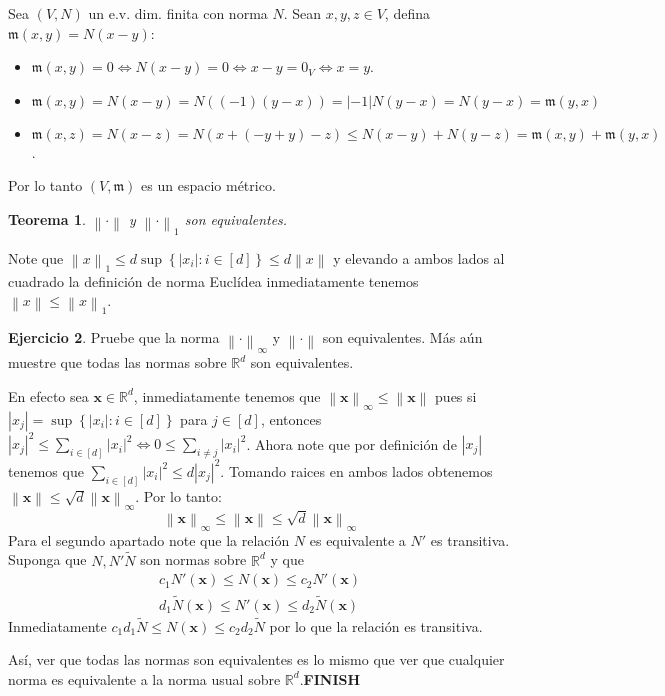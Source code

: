 \documentclass[12pt]{article}
\theoremstyle{plain}
\newtheorem{Th}{Teorema}[subsection]   %
\theoremstyle{definition}
\newtheorem{Ej}[Th]{Ejercicio}
\theoremstyle{remark}
\numberwithin{equation}{section}
\newcommand{\bR}{\mathbb{R}}        %
\newcommand{\mm}{\mathfrak{m}}      %
\renewcommand{\leq}{\leqslant}      %
\renewcommand{\:}{\colon}           %
\renewcommand{\vec}[1]{\mathbf{#1}}
\newcommand{\vx}{\vec{x}}           %
\newcommand{\conj}[1]{\left\lbrace#1\right\rbrace}
\newcommand{\bonj}[1]{\left\lbrack#1\right\rbrack}
\newcommand{\nm}[1]{\left\|#1\right\|} %
\begin{document}
\begin{multicols}{2}
\begin{ptcbp}
Sea $(V,N)$ un e.v. dim. finita con norma $N$.  Sean $x,y,z\in V$, defina $\mm(x,y)=N(x-y)$:
\begin{itemize}
  \item $\mm(x,y)=0\iff N(x-y)=0\iff x-y=0_V\iff x=y$.

  \item $\mm(x,y)=N(x-y)=N((-1)(y-x))=|-1|N(y-x)=N(y-x)=\mm(y,x)$
   \item $\mm(x,z)=N(x-z)=N(x+(-y+y)-z)\leq N(x-y)+N(y-z)=\mm(x,y)+\mm(y,x)$.
\end{itemize}
Por lo tanto $(V,\mm)$ es un espacio métrico.
\end{ptcbp}

\begin{Th}
  $\nm{\cdot}$ y $\nm{\cdot}_1$ son equivalentes.
\end{Th}
\begin{ptcbp}

Note que $\nm{x}_1\leq d\sup\conj{|x_i|\colon i\in\bonj{d}}\leq d\nm{x}$ y elevando a ambos lados al cuadrado la definición de norma Euclídea inmediatamente tenemos $\nm{x}\leq \nm{x}_1$.

\end{ptcbp}

\begin{Ej}
  Pruebe que la norma $\nm{\cdot}_\infty$ y $\nm{\cdot}$ son equivalentes. Más aún muestre que todas las normas sobre $\bR^d$ son equivalentes.
\end{Ej}

\begin{ptcb}
En efecto sea $\vx\in\bR^d$, inmediatamente tenemos que $\nm{\vx}_\infty\leq \nm{\vx}$ pues si $|x_j|=\sup\conj{|x_i|\colon i\in\bonj{d}}$ para $j\in\bonj{d}$, entonces $|x_j|^2\leq\sum_{i\in\bonj{d}}|x_i|^2\iff 0\leq \sum_{i\neq j}|x_i|^2$. Ahora note que por definición de $|x_j|$ tenemos que $\sum_{i\in\bonj{d}}|x_i|^2\leq d|x_j|^2$. Tomando raices en ambos lados obtenemos $\nm{\vx}\leq \sqrt{d}\nm{\vx}_\infty$. Por lo tanto:
$$\nm{\vx}_\infty\leq \nm{\vx}\leq \sqrt{d}\nm{\vx}_\infty$$
Para el segundo apartado note que la relación $N$ es equivalente a $N'$ es transitiva. Suponga que $N,N'\widetilde{N}$ son normas sobre $\bR^d$ y que
\begin{gather*}
  c_1N'(\vx)\leq N(\vx)\leq c_2N'(\vx)\\
  d_1\widetilde{N}(\vx)\leq N'(\vx)\leq d_2\widetilde{N}(\vx)
\end{gather*}
Inmediatamente $c_1d_1\widetilde{N}\leq N(\vx)\leq c_2d_2\widetilde{N}$ por lo que la relación es transitiva.\par
Así, ver que todas las normas son equivalentes es lo mismo que ver que cualquier norma es equivalente a la norma usual sobre $\bR^d$.\textbf{FINISH}
\end{ptcb}


\end{multicols}
\end{document}
